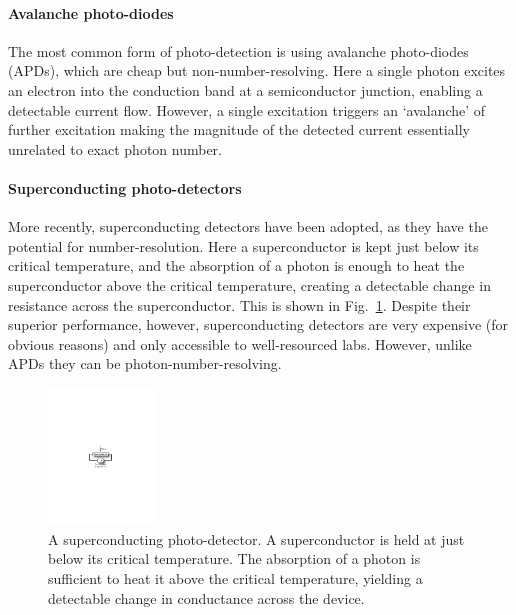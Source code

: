 %
%

\paragraph{Avalanche photo-diodes}

The most common form of photo-detection is using avalanche photo-diodes (APDs), which are cheap but non-number-resolving. Here a single photon excites an electron into the conduction band at a semiconductor junction, enabling a detectable current flow. However, a single excitation triggers an `avalanche' of further excitation making the magnitude of the detected current essentially unrelated to exact photon number.

%
%

\paragraph{Superconducting photo-detectors}

More recently, superconducting detectors have been adopted, as they have the potential for number-resolution. Here a superconductor is kept just below its critical temperature, and the absorption of a photon is enough to heat the superconductor above the critical temperature, creating a detectable change in resistance across the superconductor. This is shown in Fig.~\ref{fig:super_det}. Despite their superior performance, however, superconducting detectors are very expensive (for obvious reasons) and only accessible to well-resourced labs. However, unlike APDs they can be photon-number-resolving.

\begin{figure}[!htb]
\includegraphics[width=0.25\textwidth]{superconducting_detector}
\caption{A superconducting photo-detector. A superconductor is held at just below its critical temperature. The absorption of a photon is sufficient to heat it above the critical temperature, yielding a detectable change in conductance across the device.} \label{fig:super_det}
\end{figure}

